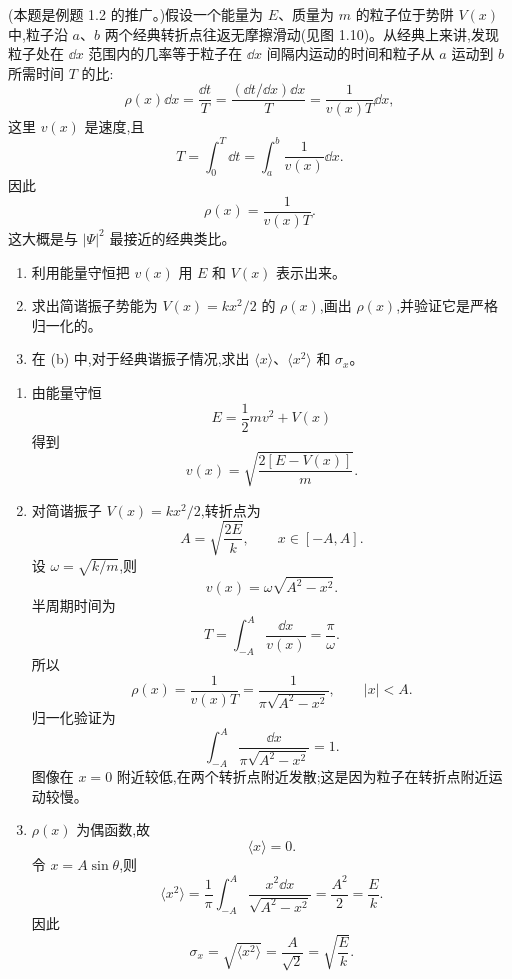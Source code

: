 \begin{question}
(本题是例题 1.2 的推广。)假设一个能量为 $E$、质量为 $m$ 的粒子位于势阱 $V(x)$ 中,粒子沿 $a$、$b$ 两个经典转折点往返无摩擦滑动(见图 1.10)。从经典上来讲,发现粒子处在 $\dd x$ 范围内的几率等于粒子在 $\dd x$ 间隔内运动的时间和粒子从 $a$ 运动到 $b$ 所需时间 $T$ 的比:
\[
\rho(x)\dd x=\frac{\dd t}{T}=\frac{(\dd t/\dd x)\dd x}{T}=\frac{1}{v(x)T}\dd x,
\tag{1.41}
\]
这里 $v(x)$ 是速度,且
\[
T=\int_0^T \dd t=\int_a^b \frac{1}{v(x)}\dd x.
\tag{1.42}
\]
因此
\[
\rho(x)=\frac{1}{v(x)T}.
\tag{1.43}
\]
这大概是与 $|\Psi|^2$ 最接近的经典类比。
\begin{enumerate}
\item 利用能量守恒把 $v(x)$ 用 $E$ 和 $V(x)$ 表示出来。
\item 求出简谐振子势能为 $V(x)=kx^2/2$ 的 $\rho(x)$,画出 $\rho(x)$,并验证它是严格归一化的。
\item 在 (b) 中,对于经典谐振子情况,求出 $\langle x\rangle$、$\langle x^2\rangle$ 和 $\sigma_x$。
\end{enumerate}
\end{question}
\begin{solution}
\begin{enumerate}
\item 由能量守恒
\[
E=\frac12mv^2+V(x)
\]
得到
\[
v(x)=\sqrt{\frac{2[E-V(x)]}{m}}.
\]
\item 对简谐振子 $V(x)=kx^2/2$,转折点为
\[
A=\sqrt{\frac{2E}{k}},\qquad x\in[-A,A].
\]
设 $\omega=\sqrt{k/m}$,则
\[
v(x)=\omega\sqrt{A^2-x^2}.
\]
半周期时间为
\[
T=\int_{-A}^{A}\frac{\dd x}{v(x)}=\frac{\pi}{\omega}.
\]
所以
\[
\rho(x)=\frac{1}{v(x)T}=\frac{1}{\pi\sqrt{A^2-x^2}},\qquad |x|<A.
\]
归一化验证为
\[
\int_{-A}^{A}\frac{\dd x}{\pi\sqrt{A^2-x^2}}=1.
\]
图像在 $x=0$ 附近较低,在两个转折点附近发散;这是因为粒子在转折点附近运动较慢。
\item $\rho(x)$ 为偶函数,故
\[
\langle x\rangle=0.
\]
令 $x=A\sin\theta$,则
\[
\langle x^2\rangle=\frac{1}{\pi}\int_{-A}^{A}\frac{x^2\dd x}{\sqrt{A^2-x^2}}
=\frac{A^2}{2}=\frac{E}{k}.
\]
因此
\[
\sigma_x=\sqrt{\langle x^2\rangle}=\frac{A}{\sqrt2}=\sqrt{\frac{E}{k}}.
\]
\end{enumerate}
\end{solution}

